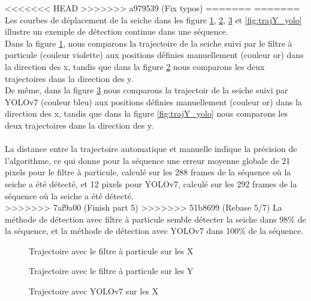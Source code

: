 <<<<<<< HEAD
>>>>>>> a979539 (Fix typos)
=======
=======
Les courbes de déplacement de la seiche dans les figure \ref{fig:trajX_pf}, \ref{fig:trajY_pf}, \ref{fig:trajX_yolo} et \ref{fig:trajY_yolo} illustre un exemple de détection continue dans une séquence.\\
Dans la figure \ref{fig:trajX_pf}, nous comparons la trajectoire de la seiche suivi par le filtre à particule (couleur violette) aux positions définies manuellement (couleur or) dans la direction des x, tandis que dans la figure \ref{fig:trajY_pf} nous comparons les deux trajectoires dans la direction des y.\\
De même, dans la figure \ref{fig:trajX_yolo} nous comparons la trajectoir de la seiche suivi par YOLOv7 (couleur bleu) aux positions définies manuellement (couleur or) dans la direction des x, tandis que dans la figure \ref{fig:trajY_yolo} nous comparons les deux trajectoires dans la direction des y.\\
\\
La distance entre la trajectoire automatique et manuelle indique la précision de l'algorithme, ce qui donne pour la séquence une erreur moyenne globale de 21 pixels pour le filtre à particule, calculé sur les 288 frames de la séquence où la seiche a été détecté, et 12 pixels pour YOLOv7, calculé sur les 292 frames de la séquence où la seiche a été détecté.\\
>>>>>>> 7af9a00 (Finish part 5)
>>>>>>> 51b8699 (Rebase 5/7)
La méthode de détection avec filtre à particule semble détecter la seiche dans 98\% de la séquence, et la méthode de détection avec YOLOv7 dans 100\% de la séquence.

\begin{figure}[!htbp]
\center
\caption{Trajectoire avec le filtre à particule sur les X}
\label{fig:trajX_pf}
\end{figure}
\FloatBarrier

\begin{figure}[!htbp]
\center
\caption{Trajectoire avec le filtre à particule sur les Y}
\label{fig:trajY_pf}
\end{figure}
\FloatBarrier

\begin{figure}[!htbp]
\center
\caption{Trajectoire avec YOLOv7 sur les X}
\label{fig:trajX_yolo}
\end{figure}
\FloatBarrier

